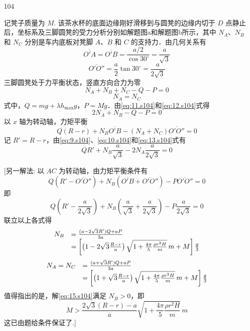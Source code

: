 \begin{solution}{104}
\begin{subsolution}
记凳子质量为 $M$. 该茶水杯的底面边缘刚好滑移到与圆凳的边缘内切于 $D$ 点静止后，坐标系及三脚圆凳的受力分析分别如解题图a和解题图b所示，其中 $N_{A}$、$N_{B}$ 和 $N_{C}$ 分别是车内底板对凳脚 $A$、$B$ 和 $C$ 的支持力．由几何关系有
\begin{equation}
\overline{O' A} = \overline{O' B} = \frac{a/2}{\cos 30^{\circ}} = \frac{a}{\sqrt{3}}
\label{eq:9.s104}
\end{equation}
\begin{equation}
\overline{O' O''} = \frac{a}{2}\tan 30^{\circ} = \frac{a}{2\sqrt{3}}
\label{eq:10.s104}
\end{equation}
三脚圆凳处于力平衡状态，竖直方向合力为零
\begin{equation}
N_{A} + N_{B} + N_{C} - Q - P = 0
\label{eq:11.s104}
\end{equation}
\begin{equation}
N_{A} = N_{C}
\label{eq:12.s104}
\end{equation}
式中，$Q = mg + \lambda h_{\max}g$，$P = Mg$．由\eqref{eq:11.s104}和\eqref{eq:12.s104}式得
\[
2N_{A} + N_{B} - Q - P = 0
\]
以 $x$ 轴为转动轴，力矩平衡
\begin{equation}
Q(R - r) + N_{B}\overline{O' B} - (N_{A} + N_{C})\overline{O' O''} = 0
\label{eq:13.s104}
\end{equation}
记 $R' = R - r$，由\eqref{eq:9.s104}、\eqref{eq:10.s104}和\eqref{eq:13.s104}式有
\[
Q R' + N_{B}\frac{a}{\sqrt{3}} - 2N_{A}\frac{a}{2\sqrt{3}} = 0
\]

[另一解法:
以 $AC$ 为转动轴，由力矩平衡条件有
\begin{equation}
Q\left(R' - \overline{O' O''}\right) + N_{B}\left(\overline{O' B} + \overline{O' O''}\right) - P\overline{O' O''} = 0
\label{eq:14.s104}
\end{equation}
即
\[
Q\left(R' - \frac{a}{2\sqrt{3}}\right) + N_{B}\left(\frac{a}{\sqrt{3}} + \frac{a}{2\sqrt{3}}\right) - P\frac{a}{2\sqrt{3}} = 0
\]
联立以上各式得
\begin{equation}
\begin{array}{r l}
N_{B} & = \frac{(a - 2\sqrt{3}R')Q + aP}{3a} \\
& = \left[\left(1 - 2\sqrt{3}\frac{R - r}{a}\right)\sqrt{1 + \frac{4\pi}{5}\frac{\rho r^{2} H}{m}}\, m + M\right]\frac{g}{3}
\end{array}
\label{eq:15.s104}
\end{equation}
\begin{equation}
\begin{array}{r l}
N_{A} = N_{C} & = \frac{(a + \sqrt{3}R')Q + aP}{3a} \\
& = \left[\left(1 + \sqrt{3}\frac{R - r}{a}\right)\sqrt{1 + \frac{4\pi}{5}\frac{\rho r^{2} H}{m}}\, m + M\right]\frac{g}{3}
\end{array}
\label{eq:16.s104}
\end{equation}
值得指出的是，解\eqref{eq:15.s104}满足 $N_{B}>0$，即
\[
M > \frac{2\sqrt{3}(R - r) - a}{a}\sqrt{1 + \frac{4\pi}{5}\frac{\rho r^{2} H}{m}}\, m
\]
这已由题给条件保证了.]


\end{subsolution}
\end{solution}
